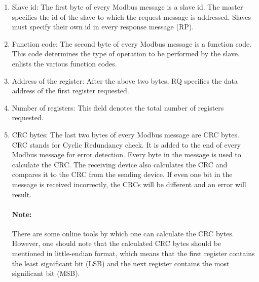 \begin{enumerate}
  \item Slave id: The first byte of every Modbus message is a slave id.
        The master specifies the id of the slave to which the request message 
        is addressed. Slaves must specify their own id in every 
        response message (RP). 
  \item Function code: The second byte of every Modbus message is a
        function code. This code determines the type of operation to be 
        performed by the slave.  enlists the various 
        function codes. 
  \item Address of the register: After the above two bytes, RQ specifies the
        data address of the first register requested. 
  \item Number of registers: This field denotes the total number of
        registers requested. 
  \item CRC bytes: The last two bytes of every Modbus message are CRC
        bytes. CRC stands for Cyclic Redundancy check.  It is added to the 
        end of every Modbus message for error detection.  
        Every byte in the message is used to calculate the CRC. 
        The receiving device also calculates the CRC and compares it to the 
        CRC from the sending device. If even one bit in the message is 
        received incorrectly, the CRCs will be different and an error will result. 
        
        \paragraph{Note:} There are some online tools \cite{online-crc} by which one can calculate 
        the CRC bytes. However, one should note that the calculated CRC bytes 
        should be mentioned in little-endian format, which means that 
        the first register contains the least significant bit (LSB) and the 
        next register contains the most significant bit (MSB).  
\end{enumerate}

